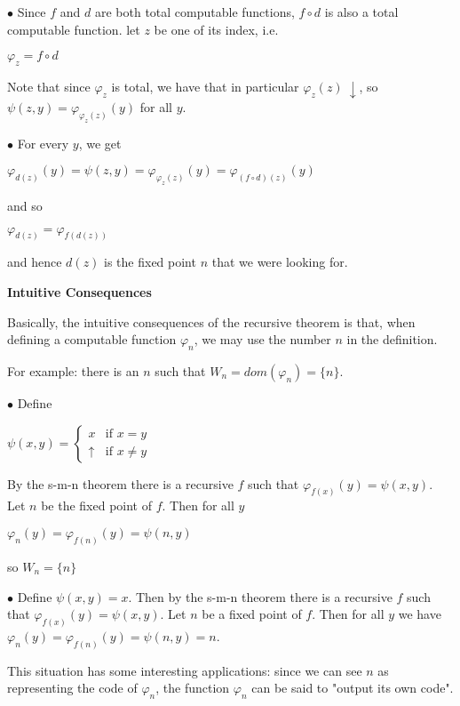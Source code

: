 $\bullet$ Since $f$ and $d$ are both total computable functions, $f\circ d$ is also a total computable function. let $z$ be one of its index, i.e.

\begin{center}
	$
	\varphi_z = f\circ d
	$
\end{center}
Note that since $\varphi_z$ is total, we have that in particular $\varphi_z(z)\ \downarrow$, so $\psi(z,y) = \varphi_{\varphi_z(z)}(y)$ for all $y$.

$\bullet$ For every $y$, we get
\begin{center}
	$
	\varphi_{d(z)}(y) = \psi(z,y) = \varphi_{\varphi_z(z)}(y) = \varphi_{(f\circ d)(z)}(y)
	$
\end{center}
and so
\begin{center}
	$
	\varphi_{d(z)} = \varphi_{f(d(z))}
	$
\end{center}
and hence $d(z)$ is the fixed point $n$ that we were looking for.

\textbf{Intuitive Consequences}

Basically, the intuitive consequences of the recursive theorem is that, when defining a computable function $\varphi_n$, we may use the number $n$ in the definition.

For example: there is an $n$ such that $W_n = dom(\varphi_n) = \{n\}$.

$\bullet$ Define 

\begin{center}
	$
	\psi(x,y)=
	\begin{cases}
		x & \text{if $x=y$}\\
		\uparrow & \text{if $x\neq y$}
	\end{cases}
	$
\end{center}
By the s-m-n theorem there is a recursive $f$ such that $\varphi_{f(x)}(y)= \psi(x,y)$. Let $n$ be the fixed point of $f$. Then for all $y$
\begin{center}
	$
	\varphi_n(y) = \varphi_{f(n)}(y) = \psi(n,y)
	$
\end{center}
so $W_n =\{n\}$

$\bullet$ Define $\psi(x,y)=x$. Then by the s-m-n theorem there is a recursive $f$ such that $\varphi_{f(x)}(y) = \psi(x,y)$. Let $n$ be a fixed point of $f$. Then for all $y$ we have $\varphi_n(y) = \varphi_{f(n)}(y) = \psi(n,y) = n$.

This situation has some interesting applications: since we can see $n$ as representing the code of $\varphi_n$, the function $\varphi_n$ can be said to "output its own code".


